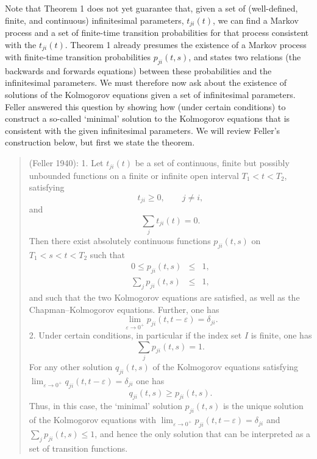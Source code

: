 \documentclass[12pt]{article}
\newcommand{\be}{\begin{equation}}
\newcommand{\ee}{\end{equation}}
\renewcommand{\epsilon}{\varepsilon}
\begin{document}
Note that Theorem 1 does not yet guarantee that, given a set of
(well-defined, finite, and continuous) infinitesimal parameters,
$t_{ji}(t)$, we can find a Markov process and a set of finite-time
transition probabilities for that process consistent with the
$t_{ji}(t)$.  Theorem 1 already presumes the existence of a Markov
process with finite-time transition probabilities $p_{ji}(t,s)$, and
states two relations (the backwards and forwards equations) between
these probabilities and the infinitesimal parameters.  We must
therefore now ask about the existence of solutions of the Kolmogorov
equations given a set of infinitesimal parameters.  Feller answered
this question by showing how (under certain conditions) to construct a
so-called `minimal' solution to the Kolmogorov equations that is
consistent with the given infinitesimal parameters.  We will review
Feller's construction below, but first we state the theorem.
\begin{quotation}
 (Feller 1940):
1. Let $t_{ji}(t)$ be a set of continuous, finite but possibly unbounded
      functions on a finite or infinite open interval $T_1<t<T_2$, satisfying
        \be
        t_{ji} \geq 0,\qquad j\neq i,
        \ee
      and
        \be
        \sum_j t_{ji}(t)=0.
        \ee
      Then there exist absolutely continuous functions $p_{ji}(t,s)$ on
      $T_1<s<t<T_2$ such that
        \begin{eqnarray}
        0\leq p_{ji}(t,s)    & \leq &     1,    \\
        \sum_j p_{ji}(t,s)   & \leq &     1,
        \end{eqnarray}
      and such that the two Kolmogorov equations are satisfied, as well as the
      Chapman--Kolmogorov equations. Further, one has
        \be
        \lim_{\epsilon\rightarrow 0^{+}}p_{ji}(t,t-\epsilon)=\delta_{ji}.
        \ee
2. Under certain conditions, in particular if the index set $I$ is finite,
      one has
        \be
        \sum_j p_{ji}(t,s)=1.
        \ee
For any other solution $q_{ji}(t,s)$ of the Kolmogorov equations satisfying
${\displaystyle \lim_{\epsilon \rightarrow 0^{+}}} q_{ji}(t,t-\epsilon) =
      \delta_{ji}$ one has
        \be
        q_{ji}(t,s)\geq p_{ji}(t,s).
        \ee
      Thus, in this case, the `minimal' solution $p_{ji}(t,s)$
      is the unique solution of the Kolmogorov equations with
${\displaystyle \lim_{\epsilon \rightarrow 0^{+}}} p_{ji}(t,t-\epsilon)
= \delta_{ji}$
      and $\sum_j p_{ji}(t,s) \leq 1$, and hence the only solution that can
      be interpreted as a set of transition functions.
\end{quotation}
\end{document}

